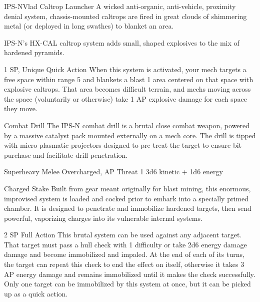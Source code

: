 \begin{mech}{IPS-N}{Vlad}
Caltrop Launcher
A wicked anti-organic, anti-vehicle, proximity denial system, chassis-mounted caltrops are fired in great clouds of shimmering metal (or deployed in long swathes) to blanket an area.

IPS-N's HX-CAL caltrop system adds small, shaped explosives to the mix of hardened pyramids.

1 SP, Unique
Quick Action
When this system is activated, your mech targets a free space within range 5 and blankets a blast 1 area centered on that space with explosive caltrops. That area becomes difficult terrain, and mechs moving across the space (voluntarily or otherwise) take 1 AP explosive damage for each space they move.

Combat Drill
The IPS-N combat drill is a brutal close combat weapon, powered by a massive catalyst pack mounted externally on a mech core. The drill is tipped with micro-plasmatic projectors designed to pre-treat the target to ensure bit purchase and facilitate drill penetration.

Superheavy Melee
Overcharged, AP
Threat 1
3d6 kinetic + 1d6 energy

Charged Stake
Built from gear meant originally for blast mining, this enormous, improvised system is loaded and cocked prior to embark into a specially primed chamber. It is designed to penetrate and immobilize hardened targets, then send powerful, vaporizing charges into its vulnerable internal systems.

2 SP
Full Action
This brutal system can be used against any adjacent target. That target must pass a hull check with 1 difficulty or take 2d6 energy damage damage and become immobilized and impaled. At the end of each of its turns, the target can repeat this check to end the effect on itself, otherwise it takes 3 AP energy damage and remains immobilized until it makes the check successfully. Only one target can be immobilized by this system at once, but it can be picked up as a quick action.


\end{mech}
